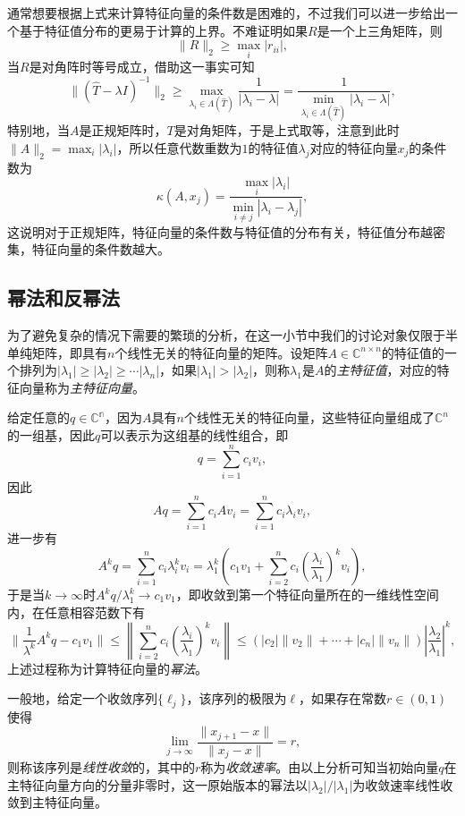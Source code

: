\documentclass[a4paper,10pt]{ctexart}
\begin{document}
通常想要根据上式来计算特征向量的条件数是困难的，不过我们可以进一步给出一个基于特征值分布的更易于计算的上界。不难证明如果$ R $是一个上三角矩阵，则
\[
    \| R \|_2 \geqslant \max_{i} |r_{ii}|,
\]
当$ R $是对角阵时等号成立，借助这一事实可知
\[
    \| (\hat{T}-\lambda I)^{-1} \|_2 \geqslant  \max_{\lambda_i\in \Lambda(\hat{T})} \frac{1}{|\lambda_i-\lambda|} = \frac{1}{\min_{\lambda_i\in \Lambda(\hat{T})} |\lambda_i-\lambda|},
\]
特别地，当$ A $是正规矩阵时，$ T $是对角矩阵，于是上式取等，注意到此时$ \| A \|_2 = \max_i |\lambda_i| $，所以任意代数重数为$ 1 $的特征值$ \lambda_j $对应的特征向量$ x_j $的条件数为
\begin{equation}
    \kappa(A,x_j) = \frac{\max_i|\lambda_i|}{\min_{i\ne j} |\lambda_i-\lambda_j|},
\end{equation}
这说明对于正规矩阵，特征向量的条件数与特征值的分布有关，特征值分布越密集，特征向量的条件数越大。

\subsection{幂法和反幂法}
为了避免复杂的情况下需要的繁琐的分析，在这一小节中我们的讨论对象仅限于半单纯矩阵，即具有$ n $个线性无关的特征向量的矩阵。设矩阵$ A\in \mathbb{C}^{n\times n} $的特征值的一个排列为$ |\lambda_1|\geqslant |\lambda_2|\geqslant \cdots |\lambda_n| $，如果$ |\lambda_1|>|\lambda_2| $，则称$ \lambda_1 $是$ A $的\emph{主特征值}，对应的特征向量称为\emph{主特征向量}。

给定任意的$ q\in \mathbb{C^n} $，因为$ A $具有$ n $个线性无关的特征向量，这些特征向量组成了$ \mathbb{C}^n $的一组基，因此$ q $可以表示为这组基的线性组合，即
\[
    q = \sum_{i=1}^{n}c_i v_i,
\]
因此
\[
    Aq = \sum_{i=1}^{n}c_i Av_i = \sum_{i=1}^{n}c_i \lambda_i v_i,
\]
进一步有
\[
    A^k q = \sum_{i=1}^{n}c_i \lambda_i^k v_i = \lambda_1^k \left( c_1 v_1 + \sum_{i=2}^{n}c_i \left( \frac{\lambda_i}{\lambda_1} \right)^k v_i \right),  
\]
于是当$ k\to \infty $时$ A^kq / \lambda_1^k \to c_1v_1 $，即收敛到第一个特征向量所在的一维线性空间内，在任意相容范数下有
\[
    \| \frac{1}{\lambda^k}A^k q - c_1v_1 \| \leqslant \left\| \sum_{i=2}^{n}c_i \left( \frac{\lambda_i}{\lambda_1} \right)^k v_i \right\| \leqslant (|c_2| \| v_2 \|+\cdots + |c_n| \| v_n \|) \left| \frac{\lambda_2}{\lambda_1} \right|^k,
\]
上述过程称为计算特征向量的\emph{幂法}。

一般地，给定一个收敛序列$ \{\ell_j\} $，该序列的极限为$ \ell $，如果存在常数$ r\in (0,1) $使得
\begin{equation}
    \lim_{j\to \infty} \frac{\| x_{j+1} - x \|}{\| x_j - x \| } = r,
\end{equation}
则称该序列是\emph{线性收敛}的，其中的$ r $称为\emph{收敛速率}。由以上分析可知当初始向量$ q $在主特征向量方向的分量非零时，这一原始版本的幂法以$ |\lambda_2|/|\lambda_1| $为收敛速率线性收敛到主特征向量。
\end{document}
